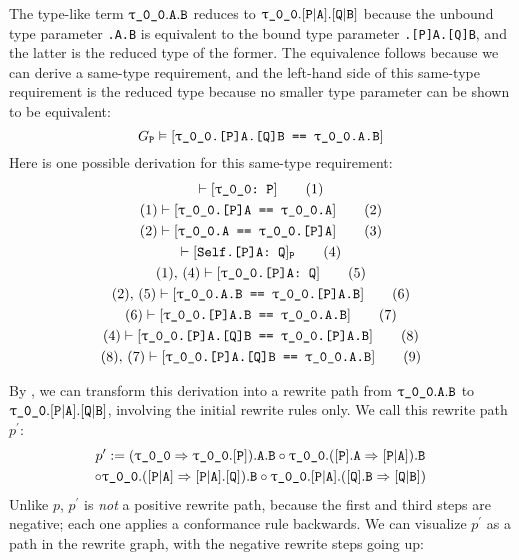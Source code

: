 \documentclass[../generics]{subfiles}
\begin{document}
\begin{example}
The type-like term $\texttt{$\uptau$\_0\_0}.\texttt{A}.\texttt{B}$ reduces to $\texttt{$\uptau$\_0\_0}.[\texttt{P}|\texttt{A}].[\texttt{Q}|\texttt{B}]$ because the unbound type parameter \texttt{.A.B} is equivalent to the bound type parameter \texttt{.[P]A.[Q]B}, and the latter is the reduced type of the former. The equivalence follows because we can derive a same-type requirement, and the left-hand side of this same-type requirement is the reduced type because no smaller type parameter can be shown to be equivalent:
\[G_\texttt{P}\vDash[\texttt{\texttt{$\uptau$\_0\_0}.[P]A.[Q]B == \texttt{$\uptau$\_0\_0}.A.B}]\]
Here is one possible derivation for this same-type requirement:
\begin{gather*}
\vdash[\texttt{\texttt{$\uptau$\_0\_0}:~P}]\tag{1}\\
(1)\vdash[\texttt{\texttt{$\uptau$\_0\_0}.[P]A == \texttt{$\uptau$\_0\_0}.A}]\tag{2}\\
(2)\vdash[\texttt{\texttt{$\uptau$\_0\_0}.A == \texttt{$\uptau$\_0\_0}.[P]A}]\tag{3}\\
\vdash[\texttt{Self.[P]A:~Q}]_\texttt{P}\tag{4}\\
(1),\,(4)\vdash[\texttt{\texttt{$\uptau$\_0\_0}.[P]A:~Q}]\tag{5}\\
(2),\,(5)\vdash[\texttt{\texttt{$\uptau$\_0\_0}.A.B == \texttt{$\uptau$\_0\_0}.[P]A.B}]\tag{6}\\
(6)\vdash[\texttt{\texttt{$\uptau$\_0\_0}.[P]A.B == \texttt{$\uptau$\_0\_0}.A.B}]\tag{7}\\
(4)\vdash[\texttt{\texttt{$\uptau$\_0\_0}.[P]A.[Q]B == \texttt{$\uptau$\_0\_0}.[P]A.B}]\tag{8}\\
(8),\,(7)\vdash[\texttt{\texttt{$\uptau$\_0\_0}.[P]A.[Q]B == \texttt{$\uptau$\_0\_0}.A.B}]\tag{9}
\end{gather*}

By , we can transform this derivation into a rewrite path from $\texttt{$\uptau$\_0\_0}.\texttt{A}.\texttt{B}$ to $\texttt{$\uptau$\_0\_0}.[\texttt{P}|\texttt{A}].[\texttt{Q}|\texttt{B}]$, involving the initial rewrite rules only. We call this rewrite path $p^\prime$:
\begin{multline*}
p^\prime := (\texttt{$\uptau$\_0\_0}\Rightarrow \texttt{$\uptau$\_0\_0}.[\texttt{P}]).\texttt{A}.\texttt{B} \circ \texttt{$\uptau$\_0\_0}.([\texttt{P}].\texttt{A}\Rightarrow[\texttt{P}|\texttt{A}]).\texttt{B}\\
\circ \texttt{$\uptau$\_0\_0}.([\texttt{P}|\texttt{A}]\Rightarrow [\texttt{P}|\texttt{A}].[\texttt{Q}]).\texttt{B} \circ \texttt{$\uptau$\_0\_0}.[\texttt{P}|\texttt{A}].([\texttt{Q}].\texttt{B}\Rightarrow[\texttt{Q}|\texttt{B}])
\end{multline*}
Unlike $p$, $p^\prime$ is \emph{not} a positive rewrite path, because the first and third steps are negative; each one applies a conformance rule backwards. We can visualize $p^\prime$ as a path in the rewrite graph, with the negative rewrite steps going up:
\begin{center}
\end{center}


\end{example}
\end{document}
